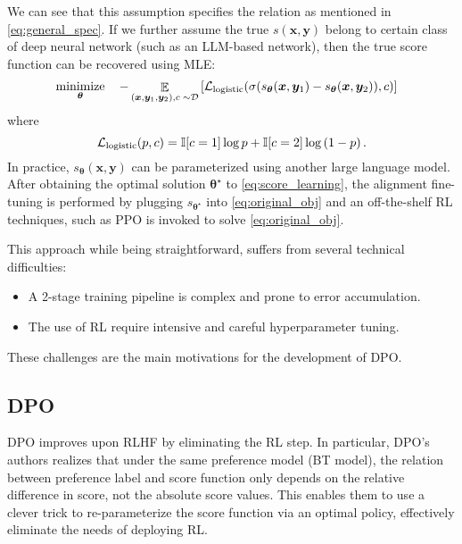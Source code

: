 \documentclass[11pt,a4paper]{article}
\begin{document}
We can see that this assumption specifies the relation as mentioned in \eqref{eq:general_spec}.
If we further assume the true $s(\bm{x}, \bm{y})$ belong to certain class of deep neural network (such as an LLM-based network), then the true score function can be recovered using MLE:
\begin{align}
\label{eq:score_learning}
& \operatorname*{\text{minimize}}_{\boldsymbol \theta} \quad -\mathop{\mathbb{E}}_{(\bm{x}, \bm{y}_1, \bm{y}_2), c \; \sim \mathcal{D}} \left[\mathcal{L}_{\rm logistic}(\sigma(s_{\boldsymbol \theta}(\bm{x}, \bm{y}_1) - s_{\boldsymbol \theta}(\bm{x}, \bm{y}_2)), c)\right]
\end{align}
where
\[
\mathcal{L}_{\rm logistic}(p, c) = \mathbb{I}[c=1] \log p + \mathbb{I}[c=2] \log \left( 1-p\right).
\]
In practice, $s_{\boldsymbol \theta}(\bm{x}, \bm{y})$ can be parameterized using another large language model.
After obtaining the optimal solution $\boldsymbol \theta^{\star }$ to \eqref{eq:score_learning}, the alignment fine-tuning is performed by plugging $s_{\boldsymbol \theta^{\star }}$ into \eqref{eq:original_obj} and an off-the-shelf RL techniques, such as PPO \citep{schulman2017proximal} is invoked to solve \eqref{eq:original_obj}.

This approach while being straightforward, suffers from several technical difficulties: 
\begin{itemize}
    \item A 2-stage training pipeline is complex and prone to error accumulation.
    \item The use of RL require intensive and careful hyperparameter tuning.
\end{itemize}
These challenges are the main motivations for the development of DPO.
\subsection{DPO}%
\label{sub:dpo}
DPO improves upon RLHF by eliminating the RL step. In particular, DPO's authors realizes that under the same preference model (BT model), the relation between preference label and score function only depends on the relative difference in score, not the absolute score values. This enables them to use a clever trick to re-parameterize the score function via an optimal policy, effectively eliminate the needs of deploying RL.
\end{document}
